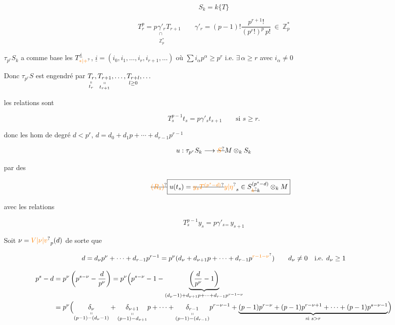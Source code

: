 \[
\boxed{S_k=k\{T\}}
\]

\[
\boxed{T_r^p=p\underset{\substack{\cap\\\mathbb{Z}_p^{*}}}{\gamma'_r}T_{r+1}}
\qquad
\gamma'_r=(p-1)!\frac{p^{r+1}!}{(p^r!)^p\,p!}\ \in\ \mathbb{Z}_p^{*}
\]

$\tau_{p^r}S_k$ a comme base les $T_{\unsure{*|+}}^{\underline{i}}$, $\underline{i}=(i_0,i_1,\ldots,i_r,i_{r+1},\ldots)$ où $\sum i_\alpha p^\alpha\geq p^r$ i.e. $\exists\,\alpha\geq r$ avec $i_\alpha\neq0$

Donc $\tau_{p^r}S$ est engendré par $\underset{\substack{\shortparallel\\t_r}}{T_r},\underset{\substack{\shortparallel\\t_{r+1}}}{T_{r+1}},\ldots,\underset{l\geq0}{T_{r+l}},\ldots$

les relations sont

\[
\boxed{T_s^{p-1}t_s=p\gamma'_s t_{s+1}\qquad\text{si }s\geq r}.
\]

donc les hom de degré $d<p^r$, $d=d_0+d_1p+\cdots+d_{r-1}p^{r-1}$

\[
u:\tau_{p^r}S_k\longrightarrow\deleted{\unsure{S}}M\otimes_k S_k
\]

 par des

\[
\tag*{\deleted{\unsure{$(R_s)$}}}
\boxed{u(t_s)=\deleted{\unsure{y_s T^{(p^s-d)}}}\unsure{y|\eta}_s\in S_{\deleted{\unsure{k}}k}^{(p^s-d)}\otimes_k M}
\]

avec les relations

\[
\tag*{$(R_s)$}
\boxed{T_s^{p-1}y_s=p\gamma'_s{}_{=}\,y_{s+1}}
\]

Soit $\nu=\unsure{V|\nu|v}_p(d)$ de sorte que

\[
d=d_\nu p^\nu+\cdots+d_{r-1}p^{r-1}=p^\nu(d_\nu+d_{\nu+1}p+\cdots+d_{r-1}p^{\unsure{r-1-\nu}})
\qquad d_\nu\neq0\quad\text{i.e. }d_\nu\geq1
\]

\[
\begin{aligned}
p^s-d&=p^\nu\left(p^{s-\nu}-\frac{d}{p^\nu}\right)
=p^\nu\Bigl(p^{s-\nu}-1-\underbrace{\left(\frac{d}{p^\nu}-1\right)}_{(d_\nu-1)+d_{\nu+1}p+\cdots+d_{r-1}p^{r-1-\nu}}\\
&=p^\nu\Bigl(
\underset{\substack{\shortparallel\\(p-1)-(d_\nu-1)}}{\delta_\nu}
+\underset{\substack{\shortparallel\\(p-1)-d_{\nu+1}}}{\delta_{\nu+1}}p+\cdots+
\underset{\substack{\shortparallel\\(p-1)-(d_{r-1})}}{\delta_{r-1}}p^{r-\nu-1}
+\underbrace{(p-1)p^{r-\nu}+(p-1)p^{r-\nu+1}+\cdots+(p-1)p^{s-\nu-1}}_{\text{si }s>r}\Bigr)
\end{aligned}
\]

